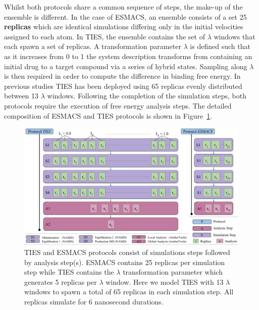 Whilst both protocols share a common sequence of steps, the make-up of the 
ensemble is different. In the case of ESMACS, an ensemble consists of a set 
25 \textbf{replicas} which are identical simulations differing only in the 
initial velocities assigned to each atom. In TIES, the ensemble contains the set 
of \textbf{$\lambda$} windows that each spawn a set of replicas. A 
transformation parameter $\lambda$ is defined such that as it increases from 
0 to 1 the system description transforms from containing an initial drug to 
a target compound via a series of hybrid states. Sampling along $\lambda$ is 
then required in order to compute the difference in binding free energy. In 
previous studies TIES has been deployed using 65 replicas evenly distributed 
between 13 $\lambda$ windows. Following the completion of the simulation steps, 
both protocols require the execution of free energy analysis steps. The detailed 
composition of ESMACS and TIES protocols is shown in 
Figure~\ref{fig:ties_esmacs_application}. 






\begin{figure}
  \centering
  \includegraphics[width=\columnwidth]{figures/ties_esmacs_application_model.pdf}
  \caption{TIES and ESMACS protocols consist of simulations steps followed
  by analysis step(s). ESMACS contains 25 replicas per simulation step while 
  TIES contains the $\lambda$ transformation parameter which generates 5 
  replicas per $\lambda$ window. Here we model TIES with 13 $\lambda$ windows to 
  spawn a total of 65 replicas in each simulation step. All replicas simulate 
  for 6 nanosecond durations.}
\label{fig:ties_esmacs_application}
\end{figure}



